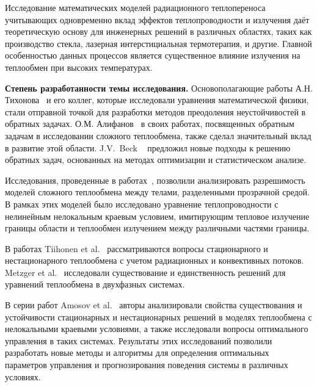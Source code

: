 Исследование математических моделей радиационного теплопереноса учитывающих одновременно
вклад эффектов теплопроводности и излучения даёт теоретическую основу для инженерных
решений в различных областях,
таких как производство стекла,
лазерная интерстициальная термотерапия, и другие.
Главной особенностью данных процессов является существенное влияние излучения
на теплообмен при высоких температурах.




\textbf{Степень разработанности темы исследования.}
Основополагающие работы А.Н. Тихонова~\cite{TikhonovSamarskii1972} и его коллег,
которые исследовали уравнения математической физики, стали отправной точкой для
разработки методов преодоления неустойчивостей в обратных задачах.
О.М. Алифанов~\cite{Aliphanov2009} в своих работах, посвященных обратным задачам
в исследовании сложного теплообмена, также сделал значительный вклад в развитие этой области.
J.V.\ Beck ~\cite[]{Beck1985-fg} предложил новые подходы к решению обратных задач,
основанных на методах оптимизации и статистическом анализе.


Исследования, проведенные в работах~\cite{
    Tiihonen1997a, Tiihonen1997b, metzger1999existence, Amosov2005,
    Amosov2009, Philip2010, Amosov2016, Amosov2017,
    amosov2010stationary, druet2009weak, druet2010weak, laitinen2001conductive,
}, позволили анализировать разрешимость моделей сложного теплообмена между телами,
разделенными прозрачной средой.
В рамках этих моделей было исследовано уравнение теплопроводности
с нелинейным нелокальным краевым условием, имитирующим тепловое излучение
границы области и теплообмен излучением между различными частями границы.

В работах Tiihonen et al.~\cite{Tiihonen1997a, Tiihonen1997b} рассматриваются вопросы
стационарного и нестационарного теплообмена с учетом радиационных и конвективных потоков.
Metzger et al.~\cite{metzger1999existence} исследовали существование и единственность
решений для уравнений теплообмена в двухфазных системах.


В серии работ Amosov et al.~\cite{
    Amosov2005, Amosov2009, Amosov2016, Amosov2017, amosov2010stationary,
} авторы анализировали свойства существования и устойчивости стационарных
и нестационарных решений в моделях теплообмена с нелокальными краевыми условиями,
а также исследовали вопросы оптимального управления в таких системах.
Результаты этих исследований позволили разработать новые методы и алгоритмы для определения
оптимальных параметров управления и прогнозирования поведения системы в различных условиях.

